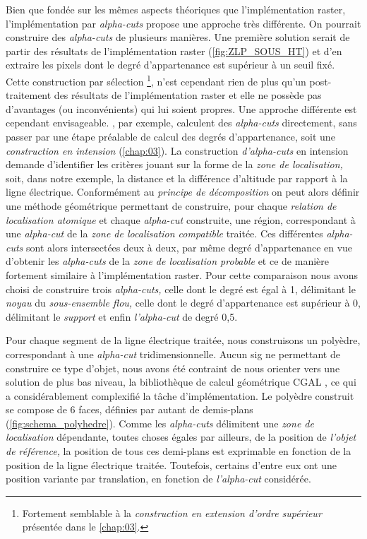 Bien que fondée sur les mêmes aspects théoriques que l'implémentation
raster, l'implémentation par \emph{alpha-cuts} propose une approche
très différente. On pourrait construire des \emph{alpha-cuts} de
plusieurs manières. Une première solution serait de partir des
résultats de l'implémentation raster (\autoref{fig:ZLP_SOUS_HT}) et
d'en extraire les pixels dont le degré d'appartenance est supérieur à
un seuil fixé. Cette construction par sélection \footnote{Fortement
  semblable à la \emph{construction en extension d'ordre supérieur}
  présentée dans le \autoref{chap:03}.}, n'est cependant rien de plus
qu'un post-traitement des résultats de l'implémentation raster et elle
ne possède pas d'avantages (ou inconvénients) qui lui soient
propres. Une approche différente est cependant
envisageable. \textcite{Runz2008a, Zoghlami2016}, par exemple,
calculent des \emph{alpha-cuts} directement, sans passer par une étape
préalable de calcul des degrés d'appartenance, soit une
\emph{construction en intension} (\autoref{chap:03}). La construction
\emph{d'alpha-cuts} en intension demande d'identifier les critères
jouant sur la forme de la \emph{zone de localisation,} soit, dans
notre exemple, la distance et la différence d'altitude par rapport à
la ligne électrique. Conformément au \emph{principe de décomposition}
on peut alors définir une méthode géométrique permettant de
construire, pour chaque \emph{relation de localisation atomique} et
chaque \emph{alpha-cut} construite, une région, correspondant à une
\emph{alpha-cut} de la \emph{zone de localisation compatible}
traitée. Ces différentes \emph{alpha-cuts} sont alors intersectées
deux à deux, par même degré d'appartenance en vue d'obtenir les
\emph{alpha-cuts} de la \emph{zone de localisation probable} et ce de
manière fortement similaire à l'implémentation raster. Pour cette
comparaison nous avons choisi de construire trois \emph{alpha-cuts,}
celle dont le degré est égal à 1, délimitant le \emph{noyau} du
\emph{sous-ensemble flou,} celle dont le degré d'appartenance est
supérieur à 0, délimitant le \emph{support} et enfin
\emph{l'alpha-cut} de degré 0,5.

Pour chaque segment de la ligne électrique traitée, nous construisons
un polyèdre, correspondant à une \emph{alpha-cut}
tridimensionnelle. Aucun \ac{sig} ne permettant de construire ce type
d'objet, nous avons été contraint de nous orienter vers une solution
de plus bas niveau, la bibliothèque de calcul géométrique CGAL
\autocite{CGAL2019}, ce qui a considérablement complexifié la tâche
d'implémentation. Le polyèdre construit se compose de 6 faces,
définies par autant de demis-plans
(\autoref{fig:schema_polyhedre}). Comme les \emph{alpha-cuts}
délimitent une \emph{zone de localisation} dépendante, toutes choses
égales par ailleurs, de la position de \emph{l'objet de référence,} la
position de tous ces demi-plans est exprimable en fonction de la
position de la ligne électrique traitée. Toutefois, certains d'entre
eux ont une position variante par translation, en fonction de
\emph{l'alpha-cut} considérée.

